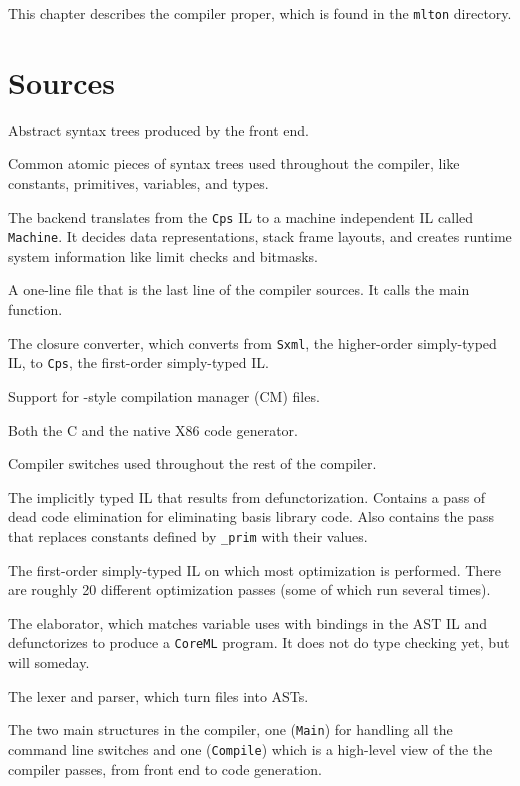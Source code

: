 
This chapter describes the compiler proper, which is found in the {\tt mlton}
directory.

\section{Sources}

\begin{description}

Abstract syntax trees produced by the front end.

Common atomic pieces of syntax trees used throughout the compiler, like
constants, primitives, variables, and types.

The backend translates from the {\tt Cps} IL to a machine independent IL called
{\tt Machine}.  It decides data representations, stack frame layouts, and creates
runtime system information like limit checks and bitmasks.

A one-line file that is the last line of the compiler sources.  It calls the
main function.

The closure converter, which converts from {\tt Sxml}, the higher-order
simply-typed IL, to {\tt Cps}, the first-order simply-typed IL.

Support for {\smlnj}-style compilation manager (CM) files.

Both the C and the native X86 code generator.

Compiler switches used throughout the rest of the compiler.

The implicitly typed IL that results from defunctorization.  Contains a
pass of dead code elimination for eliminating basis library code.  Also contains
the pass that replaces constants defined by {\tt \_prim} with their values.

The first-order simply-typed IL on which most optimization is performed.  There
are roughly 20 different optimization passes (some of which run several times).

The elaborator, which matches variable uses with bindings in the AST IL and
defunctorizes to produce a {\tt CoreML} program.  It does not do type checking
yet, but will someday. 

The lexer and parser, which turn files into ASTs.

The two main structures in the compiler, one ({\tt Main}) for handling all the
command line switches and one ({\tt Compile}) which is a high-level view of the
the compiler passes, from front end to code generation.


\end{description}
